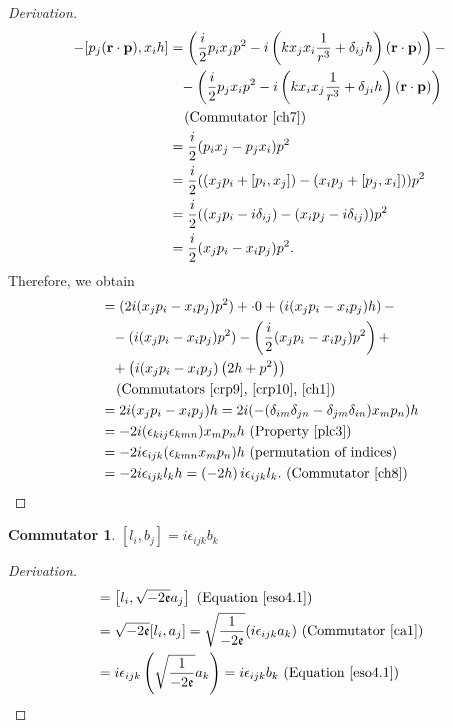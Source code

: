 \documentclass[12pt,a4paper]{report}
\theoremstyle{definition}
\newtheorem{commutator}{Commutator}[section]
\newenvironment{derivation}
  {\renewcommand\qedsymbol{$\square$}\begin{proof}[Derivation]}
  {\end{proof}}
\theoremstyle{remark}
\theoremstyle{remark}
\begin{document}
\begin{appendices}
\begin{derivation}
\begin{align*}
[p_i(\textbf{r}\cdot\textbf{p}),x_jh]-[p_j(\textbf{r}\cdot\textbf{p}),x_ih] &= \left( \frac{i}{2}p_ix_jp^2-i \left(kx_jx_i\frac{1}{r^3}+\delta_{ij}h\right)(\textbf{r}\cdot\textbf{p})\right)- \\
&\phantom{=} - \left( \frac{i}{2}p_jx_ip^2-i \left(kx_ix_j\frac{1}{r^3}+\delta_{ji}h\right)(\textbf{r}\cdot\textbf{p})\right) \\
&\phantom{=} \text{ (Commutator~\ref{ch7})} \\
&= \frac{i}{2}(p_ix_j-p_jx_i)p^2 \\
&= \frac{i}{2}((x_jp_i+[p_i,x_j])-(x_ip_j+[p_j,x_i]))p^2 \\
&=\frac{i}{2}((x_jp_i-i\delta_{ij})-(x_ip_j-i\delta_{ij}))p^2 \\
&= \frac{i}{2}(x_jp_i-x_ip_j)p^2.
\end{align*}
Therefore, we obtain \\
\begin{align*}
[a_i,a_j] &= (2i(x_jp_i-x_ip_j)p^2)+\cdot 0+\left(i(x_jp_i-x_ip_j)h\right)- \\
&\phantom{=}- (i(x_jp_i-x_ip_j)p^2)-\left(\frac{i}{2}(x_jp_i-x_ip_j)p^2\right)+\\
&\phantom{=}+\left(i(x_jp_i-x_ip_j)\left(2h+p^2\right)\right)\\
&\phantom{=}\text{ (Commutators~\ref{crp9},~\ref{crp10},~\ref{ch1})} \\
&= 2i(x_jp_i-x_ip_j)h = 2i(-(\delta_{im}\delta_{jn}-\delta_{jm}\delta_{in})x_mp_n)h \\
&= -2i(\epsilon_{kij}\epsilon_{kmn})x_mp_nh \text{ (Property~\ref{plc3})} \\
&= -2i\epsilon_{ijk}(\epsilon_{kmn}x_mp_n)h \text{ (permutation of indices)} \\
&= -2i\epsilon_{ijk}l_kh = \left(-2h\right)i\epsilon_{ijk}l_k. \text{ (Commutator~\ref{ch8})}
\end{align*}
\end{derivation}

\begin{commutator}\label{cb1}
$[l_i,b_j]=i\epsilon_{ijk}b_k$
\end{commutator}
\begin{derivation}
\begin{align*}
[l_i,b_j] &= \left[l_i,\sqrt{-2\mathfrak{e}}a_j\right] \text{ (Equation~\ref{eso4.1})} \\
&= \sqrt{-2\mathfrak{e}}[l_i,a_j]=\sqrt{\frac{1}{-2\mathfrak{e}}}(i\epsilon_{ijk}a_k) \text{ (Commutator~\ref{ca1})} \\
&= i\epsilon_{ijk}\left(\sqrt{\frac{1}{-2\mathfrak{e}}}a_k\right) = i\epsilon_{ijk}b_k \text{ (Equation~\ref{eso4.1})}
\end{align*}
\end{derivation}


\end{appendices}
\end{document}
